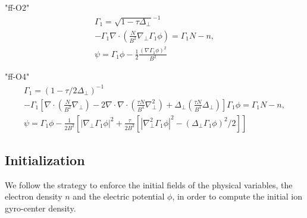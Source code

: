 "ff-O2"
\begin{subequations}
\begin{align}
\Gamma_1 = \sqrt{1- \tau\Delta_{\perp}}^{-1}\\
 -\Gamma_1\nabla\cdot \left(\frac{N}{B^2} \nabla_\perp\Gamma_1 \phi\right) = \Gamma_1 N-n,  \\
\psi = \Gamma_1 \phi - \frac{1}{2} \frac{(\nabla \Gamma_1\phi)^2}{B^2}
\end{align}
\end{subequations}

"ff-O4"
\begin{subequations}
\begin{align}
\Gamma_1 = (1- \tau/2\Delta_{\perp})^{-1}\\
 -\Gamma_1 \left[\nabla\cdot \left(\frac{N}{B^2} \nabla_\perp\right)-2   \nabla\cdot\nabla\cdot \left(\frac{\tau N}{B^4} \nabla_\perp^2\right)+  \Delta_{\perp} \left(\frac{\tau N}{B^4} \Delta_{\perp}\right)\right]\Gamma_1 \phi = \Gamma_1 N-n,  \\
\psi = \Gamma_1 \phi - \frac{1}{2 B^2} \left[|\nabla_\perp \Gamma_1\phi|^2 + \frac{\tau}{2 B^2} \left[|\nabla_\perp^2 \Gamma_1\phi |^2 - (\Delta_{\perp} \Gamma_1\phi)^2 /2 \right]\right]
\end{align}
\end{subequations}

\subsection{Initialization}
We follow the strategy to enforce the initial fields of the physical variables, the electron density \(n\) and the electric potential \(\phi\), in order to compute the initial ion gyro-center density.
